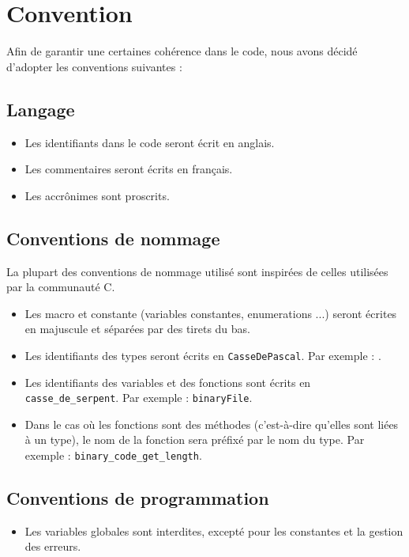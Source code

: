 \section{Convention}

Afin de garantir une certaines cohérence dans le code, nous avons décidé d'adopter les conventions suivantes :

\subsection{Langage}

\begin{itemize}
    \item Les identifiants dans le code seront écrit en anglais.
    \item Les commentaires seront écrits en français.
    \item Les accrônimes sont proscrits.
\end{itemize}


\subsection{Conventions de nommage}

La plupart des conventions de nommage utilisé sont inspirées de celles utilisées par la communauté C.

\begin{itemize}
    \item Les macro et constante (variables constantes, enumerations ...) seront écrites en majuscule et séparées par des tirets du bas.
    \item Les identifiants des types seront écrits en \texttt{CasseDePascal}. Par exemple : \binaryCode.
    \item Les identifiants des variables et des fonctions sont écrits en \texttt{casse\_de\_serpent}. Par exemple : \texttt{binaryFile}.
    \item Dans le cas où les fonctions sont des méthodes (c'est-à-dire qu'elles sont liées à un type), le nom de la fonction sera préfixé par le nom du type. Par exemple : \texttt{binary\_code\_get\_length}.
\end{itemize}

\subsection{Conventions de programmation}

\begin{itemize}
    \item Les variables globales sont interdites, excepté pour les constantes et la gestion des erreurs.
\end{itemize}